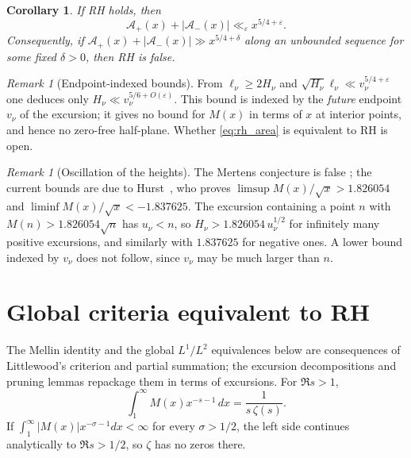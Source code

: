 \documentclass[11pt]{amsart}
\numberwithin{equation}{section}
\theoremstyle{plain}
\newtheorem{corollary}[theorem]{Corollary}
\theoremstyle{definition}
\theoremstyle{remark}
\newtheorem{remark}[theorem]{Remark}
\newcommand{\Ap}{\mathcal{A}_{+}}
\newcommand{\Am}{\mathcal{A}_{-}}
\newcommand{\eps}{\varepsilon}
\begin{document}
\begin{corollary}
\label{cor:rh}
If RH holds, then
\begin{equation}
\label{eq:rh_area}
  \Ap(x)+|\Am(x)|\ll_\eps x^{5/4+\eps}.
\end{equation}
Consequently, if $\Ap(x)+|\Am(x)|\gg x^{5/4+\delta}$ along an unbounded
sequence for some fixed $\delta>0$, then RH is false.
\end{corollary}

\begin{remark}[Endpoint-indexed bounds]
\label{rem:onedirection}
From $\ell_\nu\ge2H_\nu$ and $\sqrt{H_\nu}\ell_\nu\ll v_\nu^{5/4+\eps}$ one
deduces only $H_\nu\ll v_\nu^{5/6+O(\eps)}$. This bound is indexed by the
\emph{future} endpoint $v_\nu$ of the excursion; it gives no bound for $M(x)$
in terms of $x$ at interior points, and hence no zero-free half-plane.
Whether \eqref{eq:rh_area} is equivalent to RH is open.
\end{remark}

\begin{remark}[Oscillation of the heights]
\label{rem:omega}
The Mertens conjecture is false \cite{OdlyzkoTeRiele1985,KotnikTeRiele2006};
the current bounds are due to Hurst~\cite{Hurst18}, who proves
$\limsup M(x)/\sqrt{x}>1.826054$ and
$\liminf M(x)/\sqrt{x}<-1.837625$. The excursion containing a point $n$ with
$M(n)>1.826054\sqrt n$ has $u_\nu<n$, so $H_\nu>1.826054\,u_\nu^{1/2}$ for
infinitely many positive excursions, and similarly with $1.837625$ for
negative ones. A lower bound indexed by $v_\nu$ does not follow, since
$v_\nu$ may be much larger than $n$.
\end{remark}

\section{Global criteria equivalent to RH}
\label{sec:criteria}

The Mellin identity and the global $L^1/L^2$ equivalences below are
consequences of Littlewood's criterion and partial summation; the excursion
decompositions and pruning lemmas repackage them in terms of excursions.
For $\Re s>1$,
\begin{equation}
\label{eq:mellin_M}
  \int_1^\infty M(x)x^{-s-1}\,dx=\frac{1}{s\,\zeta(s)} .
\end{equation}
If $\int_1^\infty|M(x)|x^{-\sigma-1}dx<\infty$ for every $\sigma>1/2$, the
left side continues analytically to $\Re s>1/2$, so $\zeta$ has no zeros
there.
\end{document}
